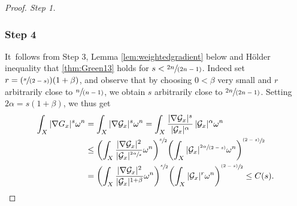 \documentclass[11pt]{article}
\numberwithin{equation}{section}
\newcommand{\Pspfrac}[2]{(\sfrac{#1}{(#2)})}
\newcommand{\psfrac}[2]{\sfrac{(#1)}{#2}}
\newcommand{\spfrac}[2]{\sfrac{#1}{(#2)}}
\theoremstyle{definition}
\begin{document}
\begin{proof}[Proof. Step 1]
\subsubsection*{Step 4}
It~follows from Step 3, Lemma \ref{lem:weightedgradient} below and Hölder inequality
that \eqref{thm:Green13} holds for $s<\spfrac{2n}{2n-1}$.
Indeed set $r=\Pspfrac{s}{2-s}(1+\beta)$, and observe that
by choosing $0<\beta$ very small and $r$ arbitrarily close to $\spfrac{n}{n-1}$,
we obtain $s$ arbitrarily close to $\spfrac{2n}{2n-1}$.
Setting $2\alpha=s(1+\beta)$, we thus get
\begin{align*}
\int_X |\nabla {G}_x|^s {\omega^n}&=
\int_X |\nabla {\mathcal G}_x|^s {\omega^n}
= \int_X \frac{|\nabla {\mathcal G}_x|^s}{|{\mathcal G}_x|^{\alpha}}\, |{\mathcal G}_x|^{\alpha} {\omega^n} \\
&\leq  \left( \int_X \frac{|\nabla {\mathcal G}_x|^2}{{|{\mathcal G}_x}|^{\sfrac{2\alpha}{s}}} {\omega^n} \right)^{\sfrac{s}{2}}
\!\left( \int_X |{\mathcal G}_x|^{\spfrac{2\alpha}{2-s}} {\omega^n} \right)^{\psfrac{2-s}{2}} \\
&= \left( \int_X \frac{|\nabla {\mathcal G}_x|^2}{{|{\mathcal G}_x}|^{1+\beta}} {\omega^n} \right)^{\sfrac{s}{2}}
\!\left( \int_X |{\mathcal G}_x|^{r} {\omega^n} \right)^{\psfrac{2-s}{2}} \leq C(s).\qedhere
\end{align*}
\end{proof}
\end{document}
